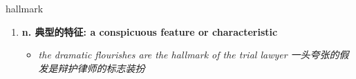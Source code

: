 
\begin{frame}
{\huge hallmark}
\begin{center}
\begin{enumerate}\Large
  \item \textbf{n. 典型的特征: a conspicuous feature or characteristic}
  \begin{itemize}
    \item \em{\Large{the dramatic flourishes are the hallmark of the trial lawyer 一头夸张的假发是辩护律师的标志装扮}}
  \end{itemize}
\end{enumerate}
\end{center}
\end{frame}
